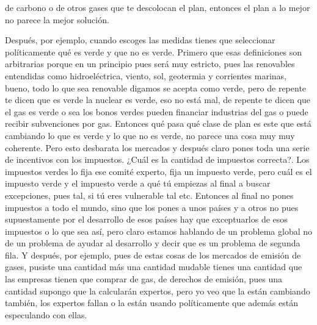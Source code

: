 de carbono o de otros gases que te descolocan el plan, entonces el plan a lo mejor no parece la mejor solución.

Después, por ejemplo, cuando escoges las medidas tienes que seleccionar políticamente qué es verde y que no es verde. Primero que esas definiciones son arbitrarias porque en un principio pues será muy estricto, pues las renovables entendidas como hidroeléctrica, viento, sol, geotermia y corrientes marinas, bueno, todo lo que sea renovable digamos se acepta como verde, pero de repente te dicen que es verde la nuclear es verde, eso no está mal, de repente te dicen que el gas es verde o sea los bonos verdes pueden financiar industrias del gas o puede recibir subvenciones por gas. Entonces qué pasa qué clase de plan es este que está cambiando lo que es verde y lo que no es verde, no parece una cosa muy muy coherente. Pero esto desbarata los mercados y después claro pones toda una serie de incentivos con los impuestos. ¿Cuál es la cantidad de impuestos correcta?. Los impuestos verdes lo fija ese comité experto, fija un impuesto verde, pero cuál es el impuesto verde y el impuesto verde a qué tú empiezas al final a buscar excepciones, pues tal, si tú eres vulnerable tal etc. Entonces al final no pones impuestos a todo el mundo, sino que los pones a unos países y a otros no pues supuestamente por el desarrollo de esos países hay que exceptuarlos de esos impuestos o lo que sea así, pero claro estamos hablando de un problema global no de un problema de ayudar al desarrollo y decir que es un problema de segunda fila. Y después, por ejemplo, pues de estas cosas de los mercados de emisión de gases, pusiste una cantidad más una cantidad mudable tienes una cantidad que las empresas tienen que comprar de gas, de derechos de emisión, pues una cantidad supongo que la calcularán expertos, pero yo veo que la están cambiando también, los expertos fallan o la están usando políticamente que además están especulando con ellas.

